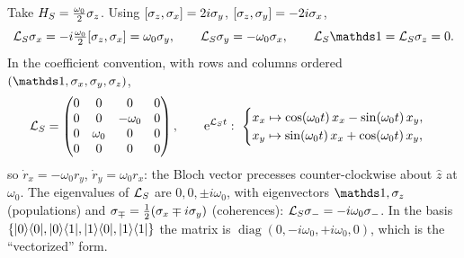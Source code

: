 \begin{exbox}
Take $H_S=\frac{\omega_0}{2}\sigma_z$.
Using $[\sigma_z,\sigma_x]=2i\sigma_y$, $[\sigma_z,\sigma_y]=-2i\sigma_x$,
\begin{equation}
  \Lc_S\sx=-i\tfrac{\omega_0}{2}[\sz,\sx]=\omega_0\sy,\qquad
  \Lc_S\sy=-\omega_0\sx,\qquad \Lc_S\Id=\Lc_S\sz=0 .
\end{equation}
In the coefficient convention, with rows and columns ordered $(\Id,\sx,\sy,\sz)$,
\begin{equation}
  \Lc_S=\begin{pmatrix}0&0&0&0\\0&0&-\omega_0&0\\0&\omega_0&0&0\\0&0&0&0\end{pmatrix},
  \qquad
  \ee^{\Lc_St}:\ \begin{cases}x_x\mapsto\cos(\omega_0t)\,x_x-\sin(\omega_0t)\,x_y,\\ x_y\mapsto\sin(\omega_0t)\,x_x+\cos(\omega_0t)\,x_y,\end{cases}
  \label{eq:LS-bloch}
\end{equation}
so $\dot r_x=-\omega_0r_y$, $\dot r_y=\omega_0r_x$: the Bloch vector precesses counter-clockwise about $\hat z$ at $\omega_0$.
The eigenvalues of $\mathcal{L}_S$ are $0,0,\pm i\omega_0$, with eigenvectors $\Id,\sz$ (populations) and $\sigma_\mp=\tfrac12(\sigma_x\mp i\sigma_y)$ (coherences): $\mathcal{L}_S\sigma_-=-i\omega_0\sigma_-$.
In the basis $\{|0\rangle\langle0|,|0\rangle\langle1|,|1\rangle\langle0|,|1\rangle\langle1|\}$ the matrix is $\operatorname{diag}(0,-i\omega_0,+i\omega_0,0)$, which is the ``vectorized'' form.
\end{exbox}


